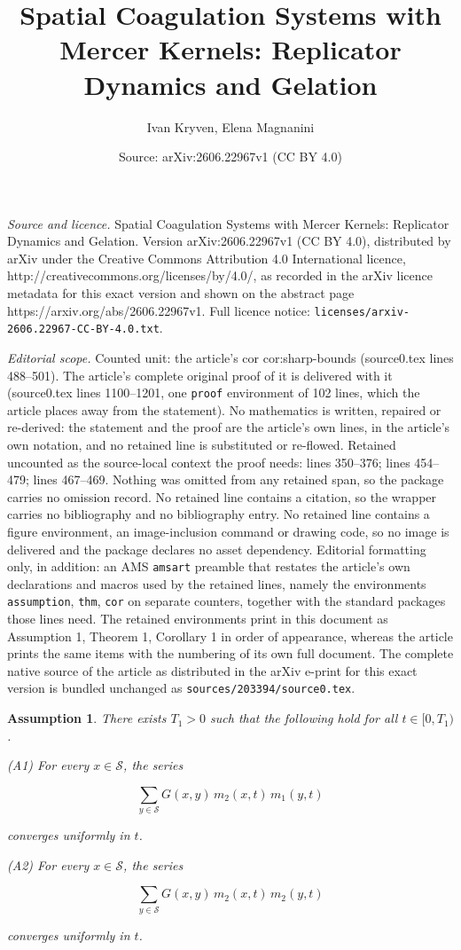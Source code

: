 \documentclass[10pt,a4paper]{amsart}
\title{Spatial Coagulation Systems with Mercer Kernels: Replicator Dynamics and Gelation}
\author{Ivan Kryven, Elena Magnanini}
\date{Source: arXiv:2606.22967v1 (CC BY 4.0)}
\newtheorem{assumption}{Assumption}
\begin{document}
\maketitle

\noindent\emph{Source and licence.} Spatial Coagulation Systems with Mercer Kernels: Replicator Dynamics and Gelation. Version arXiv:2606.22967v1 (CC BY 4.0), distributed by arXiv under the Creative Commons Attribution 4.0 International licence, http://creativecommons.org/licenses/by/4.0/, as recorded in the arXiv licence metadata for this exact version and shown on the abstract page https://arxiv.org/abs/2606.22967v1. Full licence notice: \texttt{licenses/arxiv-2606.22967-CC-BY-4.0.txt}.\par\smallskip

\noindent\textit{Editorial scope.} Counted unit: the article's cor cor:sharp-bounds (source0.tex lines 488--501). The article's complete original proof of it is delivered with it (source0.tex lines 1100--1201, one \texttt{proof} environment of 102 lines, which the article places away from the statement). No mathematics is written, repaired or re-derived: the statement and the proof are the article's own lines, in the article's own notation, and no retained line is substituted or re-flowed.  Retained uncounted as the source-local context the proof needs: lines 350--376; lines 454--479; lines 467--469.  Nothing was omitted from any retained span, so the package carries no omission record.  No retained line contains a citation, so the wrapper carries no bibliography and no bibliography entry.  No retained line contains a figure environment, an image-inclusion command or drawing code, so no image is delivered and the package declares no asset dependency.  Editorial formatting only, in addition: an AMS \texttt{amsart} preamble that restates the article's own declarations and macros used by the retained lines, namely the environments \texttt{assumption}, \texttt{thm}, \texttt{cor} on separate counters, together with the standard packages those lines need.  The retained environments print in this document as Assumption 1, Theorem 1, Corollary 1 in order of appearance, whereas the article prints the same items with the numbering of its own full document.  The complete native source of the article as distributed in the arXiv e-print for this exact version is bundled unchanged as \texttt{sources/203394/source0.tex}.
\begin{assumption}\label{ass:moment-justification}
There exists $T_1>0$ such that the following hold for all $t\in[0,T_1)$.

\smallskip
\noindent\hypertarget{ass:A1}{\textnormal{(A1)}}  
For every $x\in\mathcal S$, the series


\[
\sum_{y\in\mathcal S} G(x,y)\,m_2(x,t)\,m_1(y,t)
\]


converges uniformly in $t$.

\smallskip
\noindent\hypertarget{ass:A2}{\textnormal{(A2)}}  
For every $x\in\mathcal S$, the series


\[
\sum_{y\in\mathcal S} G(x,y)\,m_2(x,t)\,m_2(y,t)
\]


converges uniformly in $t$.
\end{assumption}
\end{document}
